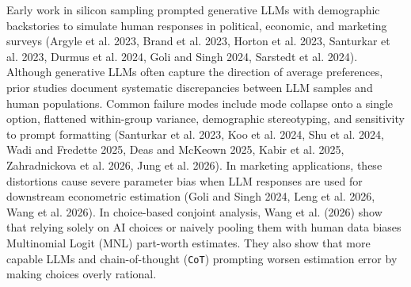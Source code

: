 \documentclass[
  letterpaper,
  DIV=11,
  numbers=noendperiod]{scrartcl}
\begin{document}
Early work in silicon sampling prompted generative LLMs with demographic
backstories to simulate human responses in political, economic, and
marketing surveys (Argyle et al. 2023, Brand et al. 2023, Horton et al.
2023, Santurkar et al. 2023, Durmus et al. 2024, Goli and Singh 2024,
Sarstedt et al. 2024). Although generative LLMs often capture the
direction of average preferences, prior studies document systematic
discrepancies between LLM samples and human populations. Common failure
modes include mode collapse onto a single option, flattened within-group
variance, demographic stereotyping, and sensitivity to prompt formatting
(Santurkar et al. 2023, Koo et al. 2024, Shu et al. 2024, Wadi and
Fredette 2025, Deas and McKeown 2025, Kabir et al. 2025, Zahradnickova
et al. 2026, Jung et al. 2026). In marketing applications, these
distortions cause severe parameter bias when LLM responses are used for
downstream econometric estimation (Goli and Singh 2024, Leng et al.
2026, Wang et al. 2026). In choice-based conjoint analysis, Wang et al.
(2026) show that relying solely on AI choices or naively pooling them
with human data biases Multinomial Logit (MNL) part-worth estimates.
They also show that more capable LLMs and chain-of-thought
(\texttt{CoT}) prompting worsen estimation error by making choices
overly rational.
\end{document}
